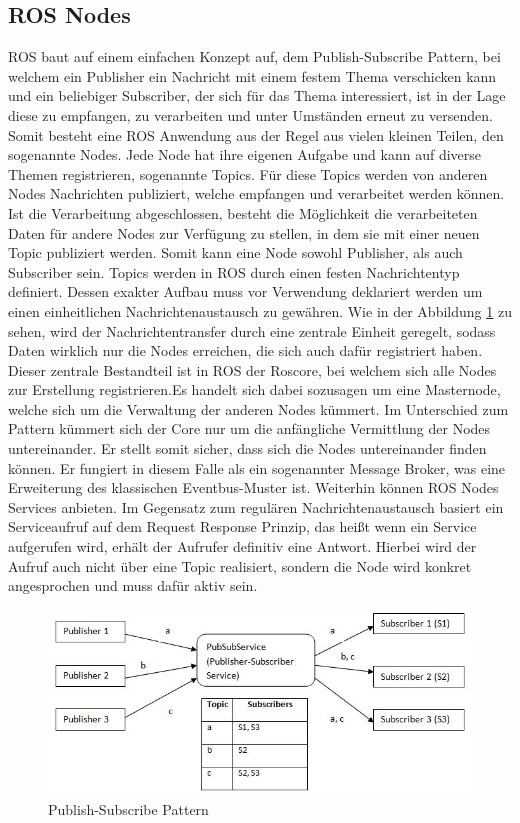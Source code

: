 \subsection{ROS Nodes}
ROS baut auf einem einfachen Konzept auf, dem Publish-Subscribe Pattern, bei welchem ein Publisher ein Nachricht mit einem festem Thema verschicken kann und ein beliebiger Subscriber, der sich für das Thema interessiert, ist in der Lage diese zu empfangen, zu verarbeiten und unter Umständen erneut zu versenden.  Somit besteht eine ROS Anwendung aus der Regel aus vielen kleinen Teilen, den sogenannte Nodes. Jede Node hat ihre eigenen Aufgabe und kann auf diverse Themen registrieren, sogenannte Topics. Für diese Topics werden von anderen Nodes Nachrichten publiziert, welche empfangen und verarbeitet werden können. Ist die Verarbeitung abgeschlossen, besteht die Möglichkeit die verarbeiteten Daten für andere Nodes zur Verfügung zu stellen, in dem sie mit einer neuen Topic publiziert werden. Somit kann eine Node sowohl Publisher, als auch Subscriber sein. \newline
Topics werden in ROS durch einen festen Nachrichtentyp definiert. Dessen exakter Aufbau muss vor Verwendung deklariert werden um einen einheitlichen Nachrichtenaustausch zu gewähren. Wie in der Abbildung \ref{fig:PubSub} zu sehen, wird der Nachrichtentransfer durch eine zentrale Einheit geregelt, sodass Daten wirklich nur die Nodes erreichen, die sich auch dafür registriert haben. Dieser zentrale Bestandteil ist in ROS der Roscore, bei welchem sich alle Nodes zur Erstellung registrieren.Es handelt sich dabei sozusagen um eine Masternode, welche sich um die Verwaltung der anderen Nodes kümmert. Im Unterschied zum Pattern kümmert sich der Core nur um die anfängliche Vermittlung der Nodes untereinander. Er stellt somit sicher, dass sich die Nodes untereinander finden können. Er fungiert in diesem Falle als ein sogenannter Message Broker\cite{messagebroker}, was eine Erweiterung des klassischen Eventbus-Muster ist\cite{eventbus}. Weiterhin können ROS Nodes Services anbieten. Im Gegensatz zum regulären Nachrichtenaustausch basiert ein Serviceaufruf auf dem Request Response Prinzip, das heißt wenn ein Service aufgerufen wird, erhält der Aufrufer definitiv eine Antwort. Hierbei wird der Aufruf auch nicht über eine Topic realisiert, sondern die Node wird konkret angesprochen und muss dafür aktiv sein.\cite{rosbook}\cite{rosconcepts}
\begin{figure}[ht]
		\centering
	\includegraphics[scale=0.7]{Bilder/pubsub1.jpg}
	\caption[Publish-Subscribe Pattern]{Publish-Subscribe Pattern}
	\label{fig:PubSub}
\end{figure}

